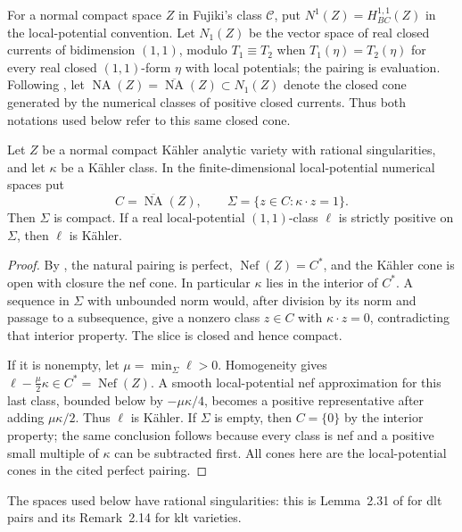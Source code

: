 For a normal compact space \(Z\) in Fujiki's class \(\mathcal C\), put
\(N^1(Z)=H^{1,1}_{BC}(Z)\) in the local-potential convention.  Let
\(N_1(Z)\) be the vector space of real closed currents of bidimension
\((1,1)\), modulo \(T_1\equiv T_2\) when \(T_1(\eta)=T_2(\eta)\) for every
real closed \((1,1)\)-form \(\eta\) with local potentials; the pairing is
evaluation.  Following
\cite[Definitions~3.6 and~3.8, pp.~8--9]{HoeringPeternell2016}, let
\(\operatorname{NA}(Z)=\overline{\operatorname{NA}}(Z)\subset N_1(Z)\)
denote the closed cone generated by the numerical classes of positive
closed currents.  Thus both notations used below refer to this same closed
cone.

\begin{lemma}\label{lem:na-slice}
Let \(Z\) be a normal compact K\"ahler analytic variety with rational
singularities, and let \(\kappa\) be a K\"ahler class.  In the
finite-dimensional local-potential numerical spaces put
\[
 C=\overline{\operatorname{NA}}(Z),\qquad
 \Sigma=\{z\in C:\kappa\cdot z=1\}.
\]
Then \(\Sigma\) is compact.  If a real local-potential \((1,1)\)-class
\(\ell\) is strictly positive on \(\Sigma\), then \(\ell\) is
K\"ahler.
\end{lemma}
\begin{proof}
By \cite[Lemma~2.3 and Proposition~2.4]{DasHaconPaun2024}, the natural
pairing is perfect, \(\operatorname{Nef}(Z)=C^*\), and the K\"ahler
cone is open with closure the nef cone.  In particular \(\kappa\) lies
in the interior of \(C^*\).  A sequence in \(\Sigma\) with unbounded
norm would, after division by its norm and passage to a subsequence,
give a nonzero class \(z\in C\) with \(\kappa\cdot z=0\), contradicting
that interior property.  The slice is closed and hence compact.

If it is nonempty, let \(\mu=\min_\Sigma\ell>0\).  Homogeneity gives
\(\ell-\frac\mu2\kappa\in C^*=\operatorname{Nef}(Z)\).  A smooth
local-potential nef approximation for this last class, bounded below by
\(-\mu\kappa/4\), becomes a positive representative after adding
\(\mu\kappa/2\).  Thus \(\ell\) is K\"ahler.  If \(\Sigma\) is
empty, then \(C=\{0\}\) by the interior property; the same conclusion
follows because every class is nef and a positive small multiple of
\(\kappa\) can be subtracted first.  All cones here are the
local-potential cones in the cited perfect pairing.
\end{proof}

The spaces used below have rational singularities: this is Lemma~2.31
of \cite{DasHacon2024} for dlt pairs and its Remark~2.14 for klt varieties.

